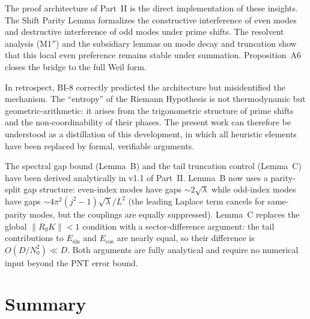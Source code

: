 \documentclass[12pt,a4paper]{article}
\theoremstyle{definition}
\theoremstyle{remark}
\begin{document}
The proof architecture of Part~II is the direct implementation of these insights. The Shift Parity Lemma formalizes the constructive interference of even modes and destructive interference of odd modes under prime shifts. The resolvent analysis (M1$''$) and the subsidiary lemmas on mode decay and truncation show that this local even preference remains stable under summation. Proposition~A6 closes the bridge to the full Weil form.

In retrospect, BI-8 correctly predicted the architecture but misidentified the mechanism. The ``entropy'' of the Riemann Hypothesis is not thermodynamic but geometric-arithmetic: it arises from the trigonometric structure of prime shifts and the non-coordinability of their phases. The present work can therefore be understood as a distillation of this development, in which all heuristic elements have been replaced by formal, verifiable arguments.

The spectral gap bound (Lemma~B) and the tail truncation control (Lemma~C) have been derived analytically in v1.1 of Part~II. Lemma~B now uses a parity-split gap structure: even-index modes have gaps $\sim 2\sqrt{\lambda}$ while odd-index modes have gaps $\sim 4\pi^2(j^2-1)\sqrt{\lambda}/L^2$ (the leading Laplace term cancels for same-parity modes, but the couplings are equally suppressed). Lemma~C replaces the global $\|R_0 K\| < 1$ condition with a sector-difference argument: the tail contributions to $E_{\sin}$ and $E_{\cos}$ are nearly equal, so their difference is $O(D/N_0^2) \ll D$. Both arguments are fully analytical and require no numerical input beyond the PNT error bound.


\section{Summary}
\label{sec:summary}
\end{document}
